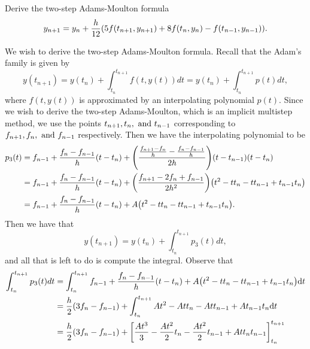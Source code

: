 \documentclass[12pt]{report}
\begin{document}
\newpage



\begin{problem}
    Derive the two-step Adams-Moulton formula
    \[ 
        y_{n+1} = y_n + \frac{h}{12} {\left(5f(t_{n+1},y_{n+1}) + 8f(t_n, y_n) - f(t_{n-1},y_{n-1})\right)}.   
    \] 
\end{problem}

\begin{solution}
    
    \noindent
    We wish to derive the two-step Adams-Moulton formula. Recall that the Adam's family is given by
    \[ 
        y(t_{n+1}) = y(t_n) + \int_{t_n}^{t_{n+1}}f(t,y(t))dt = y(t_n)+ \int_{t_n}^{t_{n+1}}p(t)dt,
    \]
    where $f(t,y(t))$ is approximated by an interpolating polynomial $p(t)$. Since we wish to derive the two-step Adams-Moulton, which is an implicit multistep method, we use the points $t_{n+1}, t_n, {~\text{and}~} t_{n-1}$ corresponding to $f_{n+1}, f_n, {~\text{and}~} f_{n-1}$ respectively. Then we have the interpolating polynomial to be
    \begin{align*}
        p_3(t) &= f_{n-1} + \frac{f_n - f_{n-1}}{h}(t - t_n) + {\left(\frac{\frac{f_{n+1} - f_n}{h} - \frac{f_n - f_{n-1}}{h}}{2h}\right)}(t - t_{n-1})(t - t_n)\\
        &= f_{n-1} + \frac{f_n - f_{n-1}}{h}(t - t_n) + {\left(\frac{f_{n+1} - 2f_n + f_{n-1}}{2h^2}\right)}{\left(t^2 - tt_n - tt_{n-1} + t_{n-1}t_n\right)}\\
        &= f_{n-1} + \frac{f_n - f_{n-1}}{h}(t - t_n) + A{\left(t^2 - tt_n - tt_{n-1} + t_{n-1}t_n\right)}.
    \end{align*} 
    Then we have that
    \[ 
        y(t_{n+1}) = y(t_n)+ \int_{t_n}^{t_{n+1}}p_3(t)dt,
    \]
    and all that is left to do is compute the integral. Observe that
    \begin{align*}
        \int_{t_n}^{t_{n+1}}p_3(t)dt &= \int_{t_n}^{t_{n+1}} f_{n-1} + \frac{f_n - f_{n-1}}{h}(t - t_n) + A\paren{t^2 - tt_n - tt_{n-1} + t_{n-1}t_n} \dt{t}\\
        &= \frac{h}{2}\paren{3f_n - f_{n-1}} + \int_{t_n}^{t_{n+1}} At^2 - Att_n - Att_{n-1} + At_{n-1}t_n \dt{t}\\
        &= \frac{h}{2}\paren{3f_n - f_{n-1}} + \left[ \frac{At^3}{3} - \frac{At^2}{2}t_n - \frac{At^2}{2}t_{n-1} + Att_n t_{n-1}\right]_{t_n}^{t_{n+1}} \\

\end{align*}
\end{solution}
\end{document}
